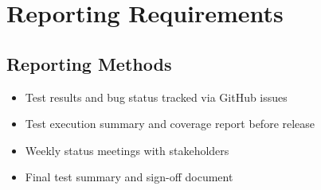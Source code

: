 \documentclass[a4paper,11pt]{scrartcl}
\begin{document}
\section{Reporting Requirements}

\subsection{Reporting Methods}
\begin{itemize}[leftmargin=*]
    \item Test results and bug status tracked via GitHub issues
    \item Test execution summary and coverage report before release
    \item Weekly status meetings with stakeholders
    \item Final test summary and sign-off document
\end{itemize}
\end{document}

